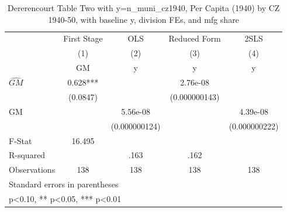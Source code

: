 \begin{table}[htbp]\centering
\def\sym#1{\ifmmode^{#1}\else\(^{#1}\)\fi}
\caption{Dererencourt Table Two with y=n\_muni\_cz1940, Per Capita (1940) by CZ 1940-50, with baseline y, division FEs, and mfg share}
\begin{tabular}{l*{4}{c}}
\toprule
                    & First Stage   &         OLS   &Reduced Form   &        2SLS   \\
                    &\multicolumn{1}{c}{(1)}&\multicolumn{1}{c}{(2)}&\multicolumn{1}{c}{(3)}&\multicolumn{1}{c}{(4)}\\
                    &\multicolumn{1}{c}{GM}&\multicolumn{1}{c}{y}&\multicolumn{1}{c}{y}&\multicolumn{1}{c}{y}\\
\midrule
$\hat{GM}$          &       0.628***&               &    2.76e-08   &               \\
                    &    (0.0847)   &               &(0.000000143)   &               \\
\addlinespace
GM                  &               &    5.56e-08   &               &    4.39e-08   \\
                    &               &(0.000000124)   &               &(0.000000222)   \\
\midrule
F-Stat              &      16.495   &               &               &               \\
R-squared           &               &        .163   &        .162   &               \\
Observations        &         138   &         138   &         138   &         138   \\
\bottomrule
\multicolumn{5}{l}{\footnotesize Standard errors in parentheses}\\
\multicolumn{5}{l}{\footnotesize * p<0.10, ** p<0.05, *** p<0.01}\\
\end{tabular}
\end{table}

